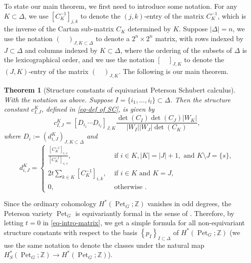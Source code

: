 \documentclass[11pt, letterpaper]{amsart}
\numberwithin{equation}{section}
\newtheorem{theorem}{Theorem}[section]
\DeclareMathOperator{\Pet}{Pet}
\begin{document}
To state our main theorem, we first need to introduce some notation. For any $K\subset\Delta$, we use $[C_{K}^{-1}]_{j,k}$ to denote the $(j, k)$-entry of the matrix $C_{K}^{-1}$, which is the inverse of the Cartan sub-matrix $C_{K}$ determined by $K$. 
Suppose $|\Delta|=n$, we use the notation $(\quad)_{J,K\subset\Delta}$ to denote a $2^n\times 2^n$ matrix, with rows indexed by $J\subset\Delta$ and columns indexed by $K\subset\Delta$, where the ordering of the subsets of $\Delta$ is the lexicographical order, and we use the notation $[\quad]_{J,K}$ to denote the $(J, K)$-entry of the matrix $(\quad)_{J,K}$. The following is our main theorem.

\begin{theorem}[Structure constants of equivariant Peterson Schubert calculus] \label{thm-intromain}
With the notation as above. Suppose $I=\{i_1, ..., i_l\} \subset \Delta$. Then the structure constant $c_{I, J}^K$, defined in \eqref{eq-def of SC}, is given by 
$$
c_{I, J}^K=\left[D_{i_1} \cdots D_{i_{\ell}}\right]_{J, K} \frac{\operatorname{det}\left(C_I\right) \operatorname{det}\left(C_J\right)\left|W_K\right|}{\left|W_I\right|\left|W_J\right| \operatorname{det}\left(C_K\right)},
$$
where $D_i:=(d^{K}_{i, J})_{J, K\subset\Delta}$ and
\begin{equation} \label{eq-intro-matrix}
d^{K}_{i, J}=\begin{cases}
\frac{[C_{K}^{-1}]_{i,s}}{[C_{K}^{-1}]_{s,s}}, &\text{ if } i\in K, |K|=|J|+1, \text{ and } K\setminus J=\{s\},\\
2t\sum_{k\in K}[C_K^{-1}]_{i,k}, &\text{ if }i\in K \text{ and }K=J,\\
0, &\text{ otherwise }.
\end{cases}
\end{equation}
\end{theorem}

Since the ordinary cohomology $H^*(\Pet_G; \mathbb{Z})$ vanishes in odd degrees, the Peterson variety $\Pet_G$ is equivariantly formal in the sense of \cite{goresky1998equivariant}. Therefore, by letting $t=0$ in \eqref{eq-intro-matrix}, we get a simple formula for all non-equivariant structure constants with respect to the basis $\left\{p_I\right\}_{I \subset \Delta}$ of $H^*(\Pet_G; \mathbb{Z})$ (we use the same notation to denote the classes under the natural map $H_S^*(\Pet_G; \mathbb{Z}) \rightarrow H^*(\Pet_G; \mathbb{Z})$). 
\end{document}
